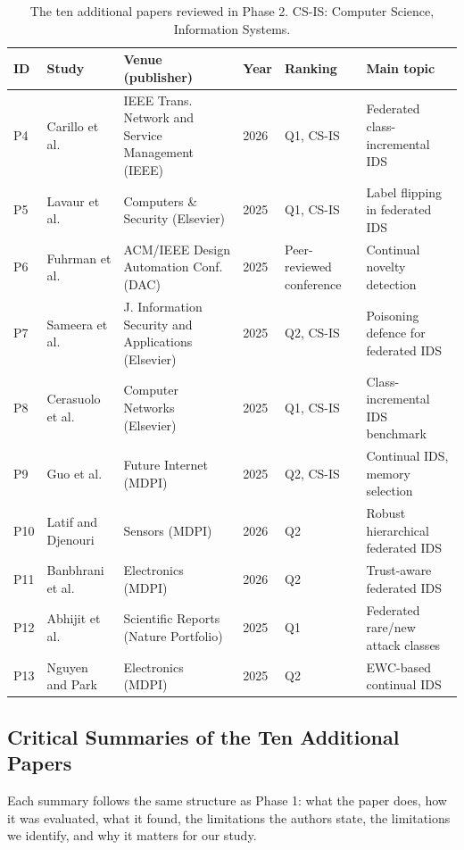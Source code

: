 \documentclass[10pt,a4paper]{article}
\begin{document}
\begin{table}[htbp]
\centering\footnotesize
\caption{The ten additional papers reviewed in Phase 2. CS-IS: Computer Science, Information Systems.}
\label{tab:corpus}
\begin{tabularx}{\linewidth}{L{0.55cm}L{3.3cm}Y L{0.8cm}L{2.9cm}L{2.6cm}}
\toprule
ID & Study & Venue (publisher) & Year & Ranking & Main topic\\
\midrule
P4 & Carillo et al. \cite{carillo} & IEEE Trans. Network and Service Management (IEEE) & 2026 & Q1, CS-IS & Federated class-incremental IDS\\
P5 & Lavaur et al. \cite{lavaur} & Computers \& Security (Elsevier) & 2025 & Q1, CS-IS & Label flipping in federated IDS\\
P6 & Fuhrman et al. \cite{cnd} & ACM/IEEE Design Automation Conf. (DAC) & 2025 & Peer-reviewed conference & Continual novelty detection\\
P7 & Sameera et al. \cite{wei} & J. Information Security and Applications (Elsevier) & 2025 & Q2, CS-IS & Poisoning defence for federated IDS\\
P8 & Cerasuolo et al. \cite{cerasuolo} & Computer Networks (Elsevier) & 2025 & Q1, CS-IS & Class-incremental IDS benchmark\\
P9 & Guo et al. \cite{guo} & Future Internet (MDPI) & 2025 & Q2, CS-IS & Continual IDS, memory selection\\
P10 & Latif and Djenouri \cite{amm} & Sensors (MDPI) & 2026 & Q2 & Robust hierarchical federated IDS\\
P11 & Banbhrani et al. \cite{flzt} & Electronics (MDPI) & 2026 & Q2 & Trust-aware federated IDS\\
P12 & Abhijit et al. \cite{rare} & Scientific Reports (Nature Portfolio) & 2025 & Q1 & Federated rare/new attack classes\\
P13 & Nguyen and Park \cite{elgnn} & Electronics (MDPI) & 2025 & Q2 & EWC-based continual IDS\\
\bottomrule
\end{tabularx}
\end{table}

\subsection{Critical Summaries of the Ten Additional Papers}
Each summary follows the same structure as Phase 1: what the paper does, how it was evaluated, what it found, the limitations the authors state, the limitations we identify, and why it matters for our study.
\end{document}
